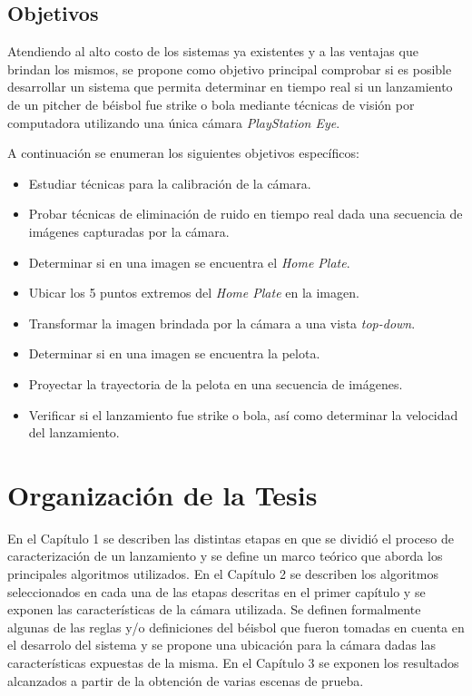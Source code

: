 \subsection*{Objetivos}

Atendiendo al alto costo de los sistemas ya existentes y a las ventajas que brindan los mismos, se propone como objetivo principal comprobar si es posible desarrollar un sistema que permita determinar en tiempo real si un lanzamiento de un pitcher de béisbol fue strike o bola mediante técnicas de visión por computadora utilizando una única cámara \textit{PlayStation Eye}.

A continuación se enumeran los siguientes objetivos específicos:
\begin{itemize}
    \item {Estudiar técnicas para la calibración de la cámara.}
    \item {Probar técnicas de eliminación de ruido en tiempo real dada una secuencia de imágenes capturadas por la cámara.}
    \item {Determinar si en una imagen se encuentra el \textit{Home Plate}.}
    \item {Ubicar los 5 puntos extremos del \textit{Home Plate} en la imagen.}
    \item {Transformar la imagen brindada por la cámara a una vista \textit{top-down}.}
    \item {Determinar si en una imagen se encuentra la pelota.}
    \item {Proyectar la trayectoria de la pelota en una secuencia de imágenes.}
    \item {Verificar si el lanzamiento fue strike o bola, así como determinar la velocidad del lanzamiento.}
\end{itemize}


\section*{Organización de la Tesis}

En el Capítulo 1 se describen las distintas etapas en que se dividió el proceso de caracterización de un lanzamiento y se define un marco teórico que aborda los principales algoritmos utilizados. En el Capítulo 2 se describen los algoritmos seleccionados en cada una de las etapas descritas en el primer capítulo y se exponen las características de la cámara utilizada. Se definen formalmente algunas de las reglas y/o definiciones del béisbol que fueron tomadas en cuenta en el desarrolo del sistema y se propone una ubicación para la cámara dadas las características expuestas de la misma. En el Capítulo 3 se exponen los resultados alcanzados a partir de la obtención de varias escenas de prueba.


